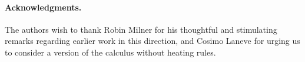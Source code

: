 \documentclass[]{entcs}
\begin{document}
\paragraph{Acknowledgments.}
The authors wish to thank Robin Milner for his thoughtful and
stimulating remarks regarding earlier work in this direction, and
Cosimo Laneve for urging us to consider a version of the calculus
without heating rules.





\end{document}
